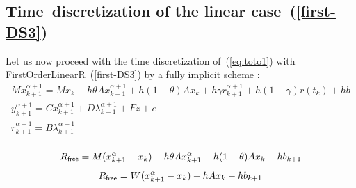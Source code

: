 
\subsection{Time--discretization of the linear case~(\ref{first-DS3}) }
Let us now proceed with the time discretization of~(\ref{eq:toto1}) with FirstOrderLinearR~(\ref{first-DS3})  by a fully implicit scheme :
\begin{equation}
  \begin{array}{l}
    \label{eq:toto1-DS3}
     M x^{\alpha+1}_{k+1} = M x_{k} +h\theta A x^{\alpha+1}_{k+1}+h(1-\theta) A x_k + h \gamma r^{\alpha+1}_{k+1}+ h(1-\gamma)r(t_k)  +hb\\[2mm]
     y^{\alpha+1}_{k+1} =  C x^{\alpha+1}_{k+1} + D \lambda ^{\alpha+1}_{k+1} +Fz +e\\[2mm]
     r^{\alpha+1}_{k+1} = B \lambda ^{\alpha+1}_{k+1} \\[2mm]
  \end{array}
\end{equation}

\[R_{{\sf free}} = M(x^{\alpha}_{k+1} - x_{k}) -h\theta A x^{\alpha}_{k+1} - h(1-\theta) A x_k -hb_{k+1} \]
\[R_{{\sf free}} = W(x^{\alpha}_{k+1} - x_{k}) -h A x_{k} -hb_{k+1} \]

